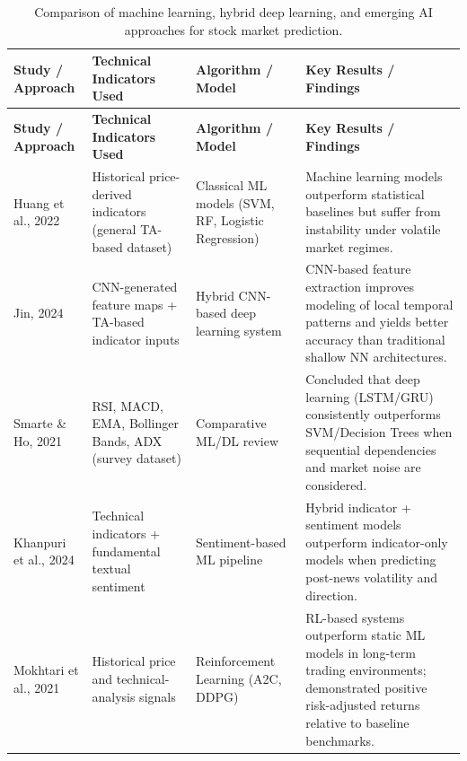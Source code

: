\begin{small}
\begin{longtable}{|p{2.0cm}|p{3.3cm}|p{2.8cm}|p{4.2cm}|}
\caption{Comparison of machine learning, hybrid deep learning, and emerging AI approaches for stock market prediction.}
\label{tab:ml_approaches_summary} \\

\hline
\textbf{Study / Approach} & \textbf{Technical Indicators Used} & \textbf{Algorithm / Model} & \textbf{Key Results / Findings} \\ \hline
\endfirsthead

\hline
\textbf{Study / Approach} & \textbf{Technical Indicators Used} & \textbf{Algorithm / Model} & \textbf{Key Results / Findings} \\ \hline
\endhead

Huang et al., 2022 \cite{Huang2022PredictiveModeling} &
Historical price-derived indicators (general TA-based dataset) &
Classical ML models (SVM, RF, Logistic Regression) &
Machine learning models outperform statistical baselines but suffer from instability under volatile market regimes. \\ \hline

Jin, 2024 \cite{Jin2024CNNStockMarket} &
CNN-generated feature maps + TA-based indicator inputs &
Hybrid CNN-based deep learning system &
CNN-based feature extraction improves modeling of local temporal patterns and yields better accuracy than traditional shallow NN architectures. \\ \hline

Smarte \& Ho, 2021 \cite{Smarte2021ReviewOfMachineLearning} &
RSI, MACD, EMA, Bollinger Bands, ADX (survey dataset) &
Comparative ML/DL review &
Concluded that deep learning (LSTM/GRU) consistently outperforms SVM/Decision Trees when sequential dependencies and market noise are considered. \\ \hline

Khanpuri et al., 2024 \cite{Khanpuri2024SentimentAnalysis} &
Technical indicators + fundamental textual sentiment &
Sentiment-based ML pipeline &
Hybrid indicator + sentiment models outperform indicator-only models when predicting post-news volatility and direction. \\ \hline

Mokhtari et al., 2021 \cite{Mokhtari2021ImpactOfAI} &
Historical price and technical-analysis signals &
Reinforcement Learning (A2C, DDPG) &
RL-based systems outperform static ML models in long-term trading environments; demonstrated positive risk-adjusted returns relative to baseline benchmarks. \\ \hline


\end{longtable}
\end{small}
